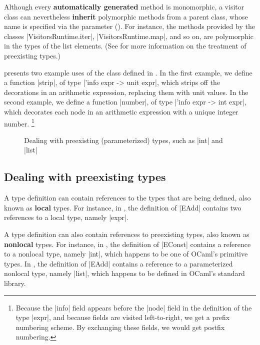\documentclass[11pt,a4paper,twoside]{article}
\renewcommand{\emph}[1]{\textbf{#1}}
\begin{document}
Although every \emph{automatically generated} method
is monomorphic, a visitor class can nevertheless \emph{inherit} polymorphic
methods from a parent class, whose name is specified via the \ancestors parameter
(). For instance, the  methods provided by
the classes \oc|VisitorsRuntime.iter|, \oc|VisitorsRuntime.map|, and so on, are
polymorphic in the types of the list elements. (See 
for more information on the treatment of preexisting types.)

 presents two example uses of the class \map defined in
. In the first example, we define a function \oc|strip|, of
type \oc|'info expr -> unit expr|, which strips off the decorations in an
arithmetic expression, replacing them with unit values. In the second example,
we define a function \oc|number|, of type \oc|'info expr -> int expr|, which
decorates each node in an arithmetic expression with a unique integer number.%
\footnote{Because the \oc|info| field appears before the \oc|node| field in
  the definition of the type \oc|expr|, and because fields are visited
  left-to-right, we get a prefix numbering scheme. By exchanging these fields,
  we would get postfix numbering.} %


\begin{figure}[t]
\vspace{-\baselineskip}
\caption{Dealing with preexisting (parameterized) types, such as \oc|int| and \oc|list|}
\label{fig:expr11}
\end{figure}

\subsection{Dealing with preexisting types}
\label{sec:intro:nonlocal}

A type definition can contain references to the types that are being defined,
also known as \emph{local} types. For instance, in , the
definition of \oc|EAdd| contains two references to a local type, namely
\oc|expr|.

A type definition can also contain references to preexisting types, also
known as \emph{nonlocal} types. For instance, in , the
definition of \oc|EConst| contains a reference to a nonlocal type, namely
\oc|int|, which happens to be one of OCaml's primitive types. In
, the definition of \oc|EAdd| contains a reference to a
parameterized nonlocal type, namely \oc|list|, which happens to be defined in
OCaml's standard library.
\end{document}
